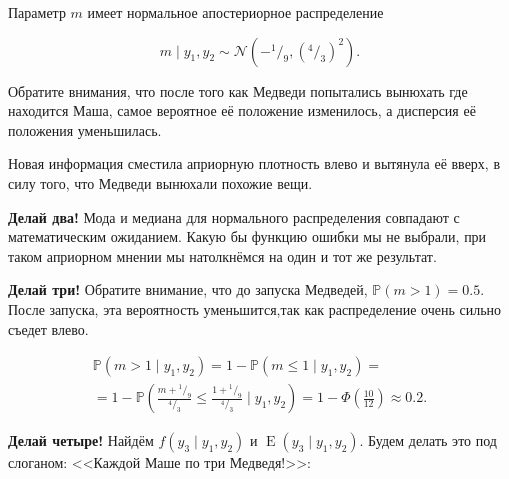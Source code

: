 \documentclass[12pt, a4paper, oneside]{extreport}
\DeclareMathOperator{\E}{\mathop{E}}
\def \mN{\mathcal{N}}
\def \mbb{\mathbb}
\def \PP{\mbb{P}}
\newcommand{\fr}[2]{\ensuremath{^#1/_#2}}   %
\newcommand\gauss[2]{1/(#2*sqrt(2*pi))*exp(-((x-#1)^2)/(2*#2^2))}
\theoremstyle{plain}              %
\theoremstyle{definition}         %
\begin{document}
Параметр $m$ имеет нормальное апостериорное распределение

\[m \mid y_1, y_2 \sim \mN(-\fr{1}{9},(\fr{4}{3})^2).\] 

 Обратите внимания, что после того как Медведи попытались вынюхать где находится Маша, самое вероятное её положение изменилось, а дисперсия её положения уменьшилась.

\begin{center}
\end{center}

Новая информация сместила априорную плотность влево и вытянула её вверх, в силу того, что Медведи вынюхали похожие вещи.

\textbf{Делай два!} Мода и медиана для нормального распределения совпадают с математическим ожиданием. Какую бы функцию ошибки мы не выбрали, при таком априорном мнении мы натолкнёмся на один и тот же результат.

\textbf{Делай три!} Обратите внимание, что до запуска Медведей, $\PP(m > 1) = 0.5$. После запуска, эта вероятность уменьшится,так как распределение очень сильно съедет влево.

\begin{multline*}
\PP(m > 1 \mid y_1,y_2) = 1 - \PP( m \le 1 \mid y_1,y_2) = \\ = 1 - \PP\left( \frac{m + \fr{1}{9}}{\fr{4}{3}} \le \frac{1 + \fr{1}{9}}{\fr{4}{3}} \mid  y_1, y_2 \right) = 1 - \Phi\left(\frac{10}{12}\right) \approx 0.2.
\end{multline*}


\textbf{Делай четыре!} Найдём $f(y_3 \mid y_1,y_2)$ и $\E(y_3 \mid y_1,y_2)$. Будем делать это под слоганом: <<Каждой Маше по три Медведя!>>:
\end{document}
